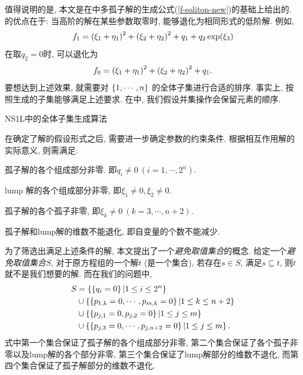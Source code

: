 值得说明的是, 本文是在中多孤子解的生成公式(\ref{f-soliton-new})的基础上给出的. 的优点在于: 当高阶的解在某些参数取零时, 能够退化为相同形式的低阶解. 例如,
\begin{equation}
    f_1=\left(\xi_1+\eta_1\right)^2+\left(\xi_2+\eta_2\right)^2+q_1+q_2 \exp(\xi_3)
\end{equation}
在取$q_2=0$时, 可以退化为
\begin{equation}
    f_0=\left(\xi_1+\eta_1\right)^2+\left(\xi_2+\eta_2\right)^2+q_1.
\end{equation}
要想达到上述效果, 就需要对 $\left\{1,\cdots,n\right\}$ 的全体子集进行合适的排序. 事实上, 按照生成的子集能够满足上述要求. 在中, 我们假设并集操作会保留元素的顺序. 

\begin{algorithm}
\caption{NS1L中的全体子集生成算法}\label{allsubset}
\end{algorithm}

在确定了解的假设形式之后, 需要进一步确定参数的约束条件. 根据相互作用解的实际意义, 则需满足:
\begin{compactenum}[(1)]
\item 孤子解的各个组成部分非零. 即$q_i\neq 0~(i=1,\cdots,2^n)$.
\item lump 解的各个组成部分非零, 即$\xi_1\neq 0,\xi_2\neq 0$.
\item 孤子解的各个孤子非零, 即$\xi_k\neq 0~(k=3,\cdots,n+2)$.
\item 孤子解和lump解的维数不能退化, 即自变量的个数不能减少. 
\end{compactenum}

为了筛选出满足上述条件的解, 本文提出了一个\emph{避免取值集合}的概念. 给定一个\emph{避免取值集合}$S$, 对于原方程组的一个解$t$ (是一个集合), 若存在$s\in S$, 满足$s\subseteq t$, 则$t$就不是我们想要的解. 而在我们的问题中, 
\begin{equation}
\begin{split}
    S&=\left\{\left\{q_i=0\right\}|1\le i \le 2^n\right\} \\ 
     &\cup \left\{\left\{p_{1,k}=0,\cdots,p_{m,k}=0\right\}|1\le k \le n+2\right\}  \\
     &\cup \left\{\left\{p_{j,1}=0,p_{j,2}=0\right\}|1\le j \le m\right\} \\ 
     &\cup \left\{\left\{p_{j,3}=0,\cdots,p_{j,n+2}=0\right\}|1\le j \le m\right\} . 
\end{split}
\end{equation}
式中第一个集合保证了孤子解的各个组成部分非零, 第二个集合保证了各个孤子非零以及lump解的各个部分非零, 第三个集合保证了lump解部分的维数不退化, 而第四个集合保证了孤子解部分的维数不退化.

